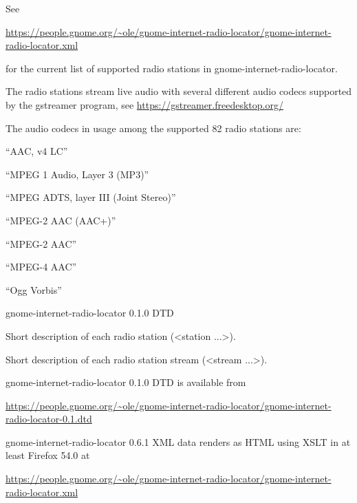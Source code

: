 \documentclass[20pt,landscape]{foils}
\begin{document}
See
\begin{tiny}\url{https://people.gnome.org/~ole/gnome-internet-radio-locator/gnome-internet-radio-locator.xml}\end{tiny} for the current list of supported radio stations in gnome-internet-radio-locator.


The radio stations stream live audio with several different audio codecs supported by the gstreamer program, see \url{https://gstreamer.freedesktop.org/}

The audio codecs in usage among the supported 82 radio stations are:

\begin{list1}
  \item
    \begin{list2}
    \item ``AAC, v4 LC''
    \item ``MPEG 1 Audio, Layer 3 (MP3)''
    \item ``MPEG ADTS, layer III (Joint Stereo)''
    \item ``MPEG-2 AAC (AAC+)''
    \item ``MPEG-2 AAC''
    \item ``MPEG-4 AAC''
    \item ``Ogg Vorbis''
    \end{list2}
\end{list1}


\begin{list1}
\item gnome-internet-radio-locator 0.1.0 DTD
\item Short description of each radio station (<station ...>).
\item Short description of each radio station stream (<stream ...>).
\item gnome-internet-radio-locator 0.1.0 DTD is available from \begin{tiny}\url{https://people.gnome.org/~ole/gnome-internet-radio-locator/gnome-internet-radio-locator-0.1.dtd}\end{tiny}
\item gnome-internet-radio-locator 0.6.1 XML data renders as HTML using XSLT in at least Firefox 54.0 at \begin{tiny}\url{https://people.gnome.org/~ole/gnome-internet-radio-locator/gnome-internet-radio-locator.xml}\end{tiny}
\end{list1}
\end{document}

